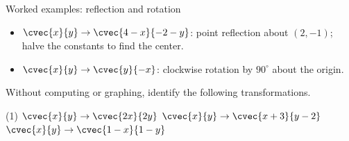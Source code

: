 \begin{frame}[t]{Worked examples: reflection and rotation}
\begin{sol}
\begin{itemize}
\item $\cvec{x}{y}\to\cvec{4-x}{-2-y}$: point reflection about $(2,-1)$; halve the constants to find the center.
\item $\cvec{x}{y}\to\cvec{y}{-x}$: clockwise rotation by $90^\circ$ about the origin.
\end{itemize}
\end{sol}
\end{frame}

\begin{frame}
\begin{exercisebox}{}{}
Without computing or graphing, identify the following transformations.
\begin{tasks}(1)
\task $\cvec{x}{y} \to \cvec{2x}{2y}$
\task $\cvec{x}{y} \to \cvec{x+3}{y-2}$
\task $\cvec{x}{y} \to \cvec{1-x}{1-y}$
\end{tasks}
\end{exercisebox}
\end{frame}

